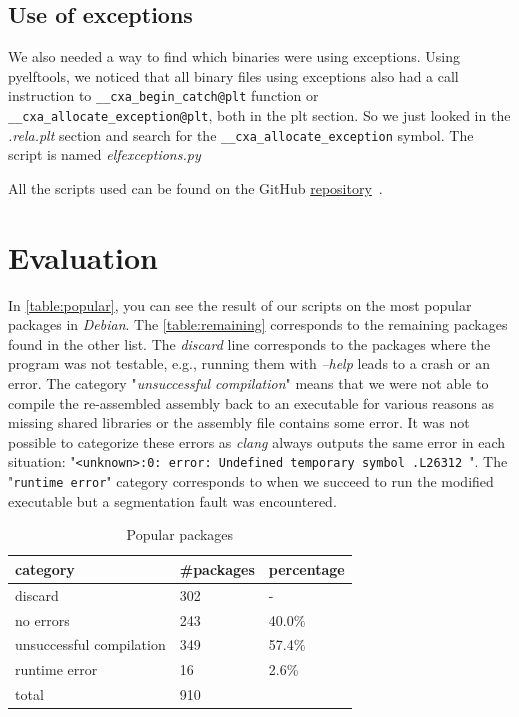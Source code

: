 \documentclass[a4paper,11pt,oneside]{report}
\begin{document}
\section{Use of exceptions}
We also needed a way to find which binaries were using exceptions. Using
pyelftools, we noticed that all binary files using exceptions also had a call
instruction to \verb|__cxa_begin_catch@plt| function or
\verb|__cxa_allocate_exception@plt|, both in the plt section. So we just looked
in the \textit{.rela.plt} section and search for the
\verb|__cxa_allocate_exception| symbol. The script is named
\textit{elfexceptions.py}


All the scripts used can be found on the GitHub
\href{https://github.com/ha2san/debian_docker/tree/main/scripts}{repository}~\cite{repo}.


\chapter{Evaluation}
In \autoref{table:popular}, you can see the result of our scripts on the most
popular packages in \textit{Debian}. The \autoref{table:remaining}
corresponds to the remaining packages found in the other list. The
\textit{discard} line corresponds to the packages where the program was not
testable, e.g., running them with \textit{--help} leads to a crash or an error. 
The category "\textit{unsuccessful compilation}" means that we were not able to
compile the re-assembled assembly back to an executable for various reasons as
missing shared libraries or the assembly file contains some error. It was not
possible to categorize these errors as \textit{clang} always outputs the same
error in each situation: "\texttt{<unknown>:0: error: Undefined temporary symbol .L26312 }".
The "\texttt{runtime error}" category corresponds to when we succeed to run
the modified executable but a segmentation fault was encountered.


\begin{table}[H]
    \centering
    \begin{tabular}{lll}
        \hline
        category                & \#packages & percentage\\
        \hline
        discard                  & 302 & - \\
        no errors                & 243 & 40.0\% \\
        unsuccessful compilation & 349 & 57.4\% \\
        runtime error            & 16  & 2.6\% \\
        \hline
        total                    & 910  \\ 
        \hline
    \end{tabular}
    \caption{Popular packages}
    \label{table:popular}
\end{table}
\end{document}

